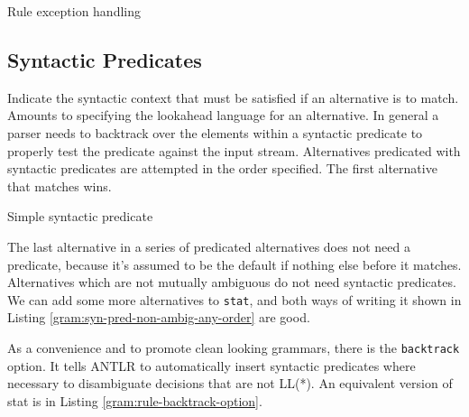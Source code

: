 \begin{program}
\caption{Rule exception handling\label{gram:rule-exception-handling}}
\end{program}


\subsection{Syntactic Predicates}

Indicate the syntactic context that must be satisfied
if an alternative is to match.
Amounts to specifying the lookahead language for an alternative.
In general a parser needs to backtrack
over the elements within a syntactic predicate
to properly test the predicate against the input stream.
Alternatives predicated with syntactic predicates
are attempted in the order specified.
The first alternative that matches wins.

\begin{program}
\caption{Simple syntactic predicate\label{gram:syn-pred-simple}}
\end{program}

The last alternative in a series of predicated alternatives
does not need a predicate,
because it's assumed to be the default if nothing else before it matches.
Alternatives which are not mutually ambiguous do not need syntactic predicates.
We can add some more alternatives to \verb=stat=, and both ways of writing it
shown in Listing \ref{gram:syn-pred-non-ambig-any-order} are good.

\begin{program}
\caption{Alternatives not mutually ambiguous %
do not need syntactic predicates and may be given in any order%
\label{gram:syn-pred-non-ambig-any-order}}
\end{program}

As a convenience and to promote clean looking grammars,
there is the \verb=backtrack= option.
It tells ANTLR to automatically insert syntactic predicates where necessary
to disambiguate decisions that are not LL(*).
An equivalent version of stat is in Listing \ref{gram:rule-backtrack-option}.

\begin{program}
\caption{An equivalent version of `stat' using the rule's backtrack option%
\label{gram:rule-backtrack-option}}
\end{program}


